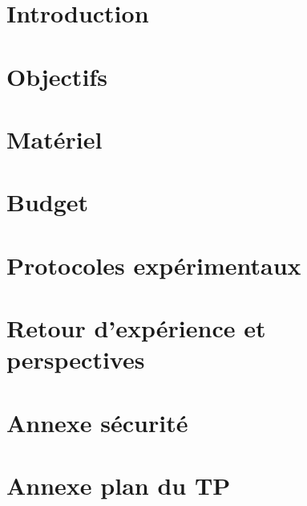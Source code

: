 \documentclass{article}
\begin{document}


\tableofcontents

\newpage

\section{{Introduction}}


\section{{Objectifs}}


\section{{Matériel}}


\section{{Budget}}


\section{{Protocoles expérimentaux}}


\section{{Retour d'expérience et perspectives}}


\newpage

\appendix

\section{{Annexe sécurité}}


\section{Annexe plan du TP}


\newpage



\end{document}
